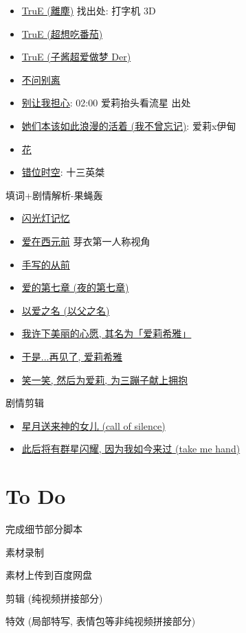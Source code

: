 \documentclass[a4paper]{article}
\begin{document}
\begin{itemize}
    \item \href{https://www.bilibili.com/video/BV1gB4y1V7XK/}{TruE (離塵)} 找出处: 打字机 3D
    \item \href{https://www.bilibili.com/video/BV1SF411w73C/}{TruE (超想吃番茄)}
    \item \href{https://www.bilibili.com/video/BV1MB4y1V71h/}{TruE (子酱超爱做梦 Der)}
    \item \href{https://www.bilibili.com/video/BV19a4y1S7wF/}{不问别离}
    \item \href{https://www.bilibili.com/video/BV1vC4y177zp/}{别让我担心}: 02:00 爱莉抬头看流星 出处
    \item \href{https://www.bilibili.com/video/BV1pu411a7cv/}{她们本该如此浪漫的活着 (我不曾忘记)}: 爱莉x伊甸
    \item \href{https://www.bilibili.com/video/BV1DT41167gi/}{花}
    \item \href{https://www.bilibili.com/video/BV1Le4y1R73E/}{错位时空}: 十三英桀
\end{itemize}

填词+剧情解析-果蝇轰

\begin{itemize}
    \item \href{https://www.bilibili.com/video/BV1HppJeuEis/}{闪光灯记忆}
    \item \href{https://www.bilibili.com/video/BV1 qN411g71m/}{爱在西元前} 芽衣第一人称视角
    \item \href{https://www.bilibili.com/video/BV1PV4y1x7CD/}{手写的从前}
    \item \href{https://www.bilibili.com/video/BV1dr4y177gy/}{爱的第七章 (夜的第七章)}
    \item \href{https://www.bilibili.com/video/BV1Yr4y1q7Pt/}{以爱之名 (以父之名)}
    \item \href{https://www.bilibili.com/video/BV1BF411w7fD/}{我许下美丽的心愿, 其名为「爱莉希雅」}
    \item \href{https://www.bilibili.com/video/BV1Cr4y1573W/}{于是...再见了, 爱莉希雅}
    \item \href{https://www.bilibili.com/video/BV1WN4y1L745/}{笑一笑, 然后为爱莉, 为三蹦子献上拥抱}
\end{itemize}

剧情剪辑

\begin{itemize}
    \item \href{https://www.bilibili.com/video/BV1ZT4y1s7Zd/}{星月送来神的女儿 (call of silence)}
    \item \href{https://www.bilibili.com/video/BV1Sm41167aK/}{此后将有群星闪耀, 因为我如今来过 (take me hand)}
\end{itemize}

\section{To Do}

完成细节部分脚本

素材录制

素材上传到百度网盘

剪辑 (纯视频拼接部分)

特效 (局部特写, 表情包等非纯视频拼接部分)
\end{document}
